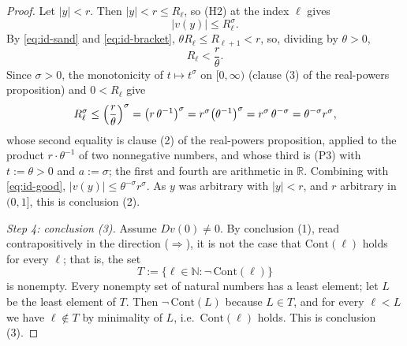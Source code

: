 \begin{proof}
Let $\lvert y\rvert<r$.  Then $\lvert y\rvert<r\le R_\ell$, so (H2) at the index $\ell$ gives
\begin{equation}\label{eq:id-good}
  \lvert v(y)\rvert\le R_\ell^{\sigma}.
\end{equation}
By \eqref{eq:id-sand} and \eqref{eq:id-bracket}, $\theta R_\ell\le R_{\ell+1}<r$, so, dividing
by $\theta>0$,
\[
  R_\ell<\frac{r}{\theta}.
\]
Since $\sigma>0$, the monotonicity of $t\mapsto t^{\sigma}$ on $[0,\infty)$ (clause (3) of the
real-powers proposition) and $0<R_\ell$ give
\[
  R_\ell^{\sigma}\le\Bigl(\frac{r}{\theta}\Bigr)^{\sigma}
  =\bigl(r\,\theta^{-1}\bigr)^{\sigma}
  =r^{\sigma}\bigl(\theta^{-1}\bigr)^{\sigma}
  =r^{\sigma}\,\theta^{-\sigma}
  =\theta^{-\sigma}r^{\sigma},
\]
whose second equality is clause (2) of the real-powers proposition, applied to the product
$r\cdot\theta^{-1}$ of two nonnegative numbers, and whose third is (P3) with $t:=\theta>0$ and
$a:=\sigma$; the first and fourth are arithmetic in $\mathbb{R}$.  Combining with
\eqref{eq:id-good},
$\lvert v(y)\rvert\le\theta^{-\sigma}r^{\sigma}$.  As $y$ was arbitrary with
$\lvert y\rvert<r$, and $r$ arbitrary in $(0,1]$, this is conclusion (2).

\medskip\noindent\emph{Step 4: conclusion (3).}
Assume $Dv(0)\ne0$.  By conclusion (1), read contrapositively in the direction
($\Rightarrow$), it is not the case that $\mathrm{Cont}(\ell)$ holds for every $\ell$; that is,
the set
\[
  T:=\{\ell\in\mathbb{N}:\neg\,\mathrm{Cont}(\ell)\}
\]
is nonempty.  Every nonempty set of natural numbers has a least element; let $L$ be the least
element of $T$.  Then $\neg\,\mathrm{Cont}(L)$ because $L\in T$, and for every $\ell<L$ we have
$\ell\notin T$ by minimality of $L$, i.e.\ $\mathrm{Cont}(\ell)$ holds.  This is conclusion
(3).
\end{proof}
